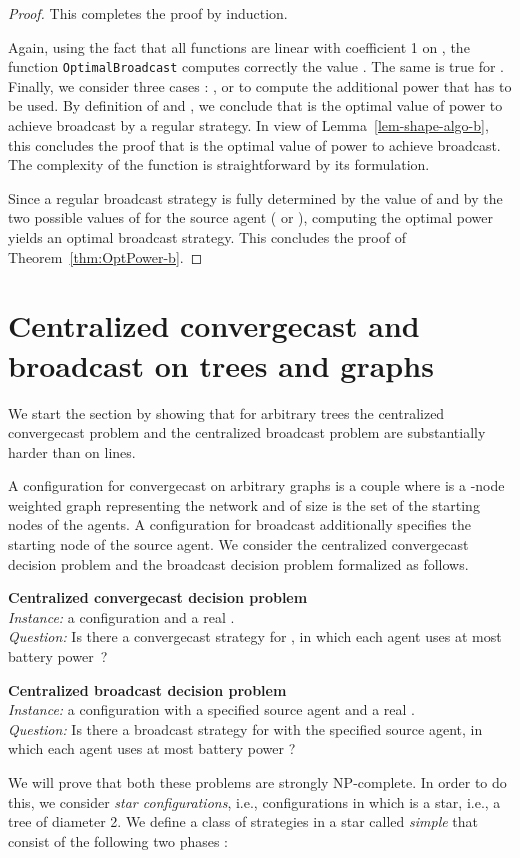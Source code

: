 \documentclass{article}
\newcommand{\probleme}[3]{\medskip\noindent\textbf{#1 problem}\\ \noindent \emph{Instance: }#2\\ \noindent \emph{Question: }#3\medskip}
\newcommand\Optbc{\mbox{{\tt OptimalBroadcast}}\xspace}
\newcommand\strat{\mbox{strategy}\xspace}
\newcommand\convergecast{convergecast\xspace}
\newcommand\broadcast{broadcast\xspace}
\newcommand\ccast{convergecast\xspace}
\newcommand\cccast{centralized convergecast\xspace}
\newcommand\Cccast{Centralized convergecast\xspace}
\begin{document}
\begin{proof}
This completes the proof by induction.

Again, using the fact that all functions  are linear with coefficient 1 on , the function \Optbc computes correctly the value . The same is true for . Finally, we consider three cases : ,  or  to compute the additional power  that has to be used.
By definition of  and , we conclude that  is the optimal value of power to achieve broadcast by a regular strategy. In view of Lemma~\ref{lem-shape-algo-b}, this concludes the proof that  is the optimal value of power to achieve broadcast. The complexity  of the function is straightforward by its formulation. 

Since a regular broadcast strategy is fully determined by the value of  and by 
the two possible values of  for the source agent  ( or ), computing the optimal power  yields an optimal broadcast strategy. This concludes the proof of Theorem~\ref{thm:OptPower-b}.
\end{proof}




\section{{\Cccast} and broadcast on trees  and graphs}\label{s:tree}

We start the section by showing that for arbitrary trees the {\cccast} problem and the centralized  broadcast problem are substantially harder than on lines.

A configuration for {\ccast} on arbitrary graphs is a couple  where  is a -node weighted graph representing the network and  of size  is the set of the starting nodes of the agents. A configuration for broadcast additionally specifies the starting node of the source agent. 
We consider the {\cccast} decision problem and the broadcast decision problem formalized as follows. 

\probleme{Centralized {\convergecast} decision}{a configuration  and a real .}{Is there a convergecast {\strat} for , in which each agent uses at most  battery power~?}

\probleme{Centralized {\broadcast} decision}{a configuration  with a specified source agent and a real .}{Is there a broadcast {\strat} for  with the specified source agent, in which each agent uses at most  battery power ?}

We will prove that both these problems are strongly NP-complete.
In order to do this, we consider \emph{star configurations}, i.e., configurations  in which  is a star, i.e., a tree of diameter 2. We define a class of strategies in a star 
called \emph{simple} that consist of the following two phases :
\end{document}

